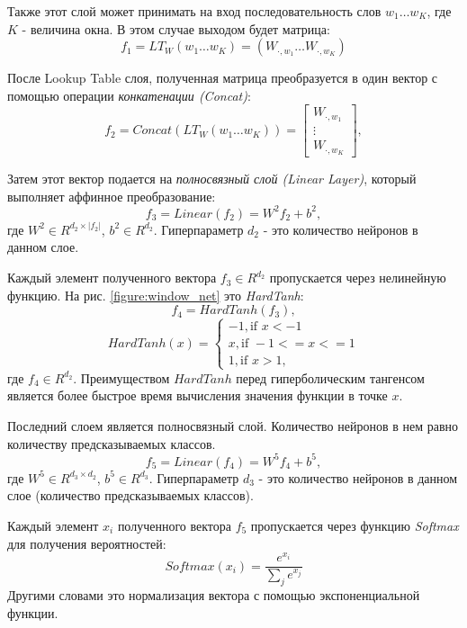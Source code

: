   Также этот слой может принимать на вход последовательность слов $w_1 \ldots w_K$,
  где $K$ - величина окна. В этом случае выходом будет матрица:
  \[
    f_1 = LT_W(w_1 \ldots w_K) = ( W_{\cdot, w_1} \ldots W_{\cdot, w_K})
  \]

  После Lookup Table слоя, полученная матрица преобразуется в один вектор с
  помощью операции \textit{конкатенации (Concat)}:
  \[
    f_{2} = Concat(LT_W(w_1 \ldots w_K)) =
      \begin{bmatrix}
        W_{\cdot, w_1} \\
        \vdots \\
        W_{\cdot, w_K}
      \end{bmatrix},
  \]

  Затем этот вектор подается на \textit{полносвязный слой (Linear Layer)}, который
  выполняет аффинное преобразование:
  \begin{equation} \label{formula:linear_layer}
    f_{3} = Linear(f_{2}) = W^2 f_{2} + b^2,
  \end{equation}
  где $W^2 \in R^{d_{2} \times |f_{2}|}$, $b^2 \in R^{d_2}$. Гиперпараметр $d_{2}$ -
  это количество нейронов в данном слое.

  Каждый элемент полученного вектора $f_3 \in R^{d_2}$ пропускается через нелинейную функцию.
  На рис. \ref{figure:window_net} это \textit{HardTanh}:
  \[
    f_{4} = HardTanh(f_{3}),
  \]
  \begin{equation} \label{formula:hard_tanh}
  HardTanh(x) =
    \begin{cases}
      -1, \text{if } x < -1 \\
      x, \text{if } -1 <= x <= 1 \\
      1, \text{if } x > 1,
    \end{cases}
  \end{equation}
  где $f_4 \in R^{d_2}$.
  Преимуществом $HardTanh$ перед гиперболическим тангенсом является более быстрое
  время вычисления значения функции в точке $x$.

  Последний слоем является полносвязный слой. Количество нейронов в нем
  равно количеству предсказываемых классов.
  \[
    f_5 = Linear(f_4) = W^5 f_{4} + b^5,
  \]
  где $W^5 \in R^{d_{3} \times d_{2}}$, $b^5 \in R^{d_3}$. Гиперпараметр $d_{3}$ -
  это количество нейронов в данном слое (количество предсказываемых классов).

  Каждый элемент $x_i$ полученного вектора $f_5$ пропускается через функцию \textit{Softmax} для получения
  вероятностей:
  \[
    Softmax(x_{i}) = \frac{e^{x_{i}}}{\sum_j e^{x_{j}}}
  \]
  Другими словами это нормализация вектора с помощью экспоненциальной функции.

